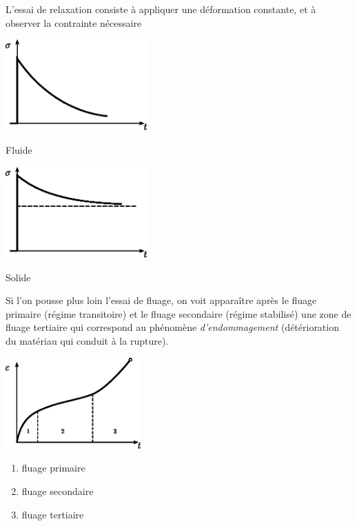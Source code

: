 L'essai de relaxation consiste à appliquer une déformation constante, et à observer la contrainte nécessaire
\begin{multicols}{2}
    \begin{center}
        \includegraphics[height=3.5cm]{../images/T1_Ch04-0019}

        Fluide
    \end{center}
    \columnbreak
    \begin{center}
        \includegraphics[height=3.5cm]{../images/T1_Ch04-0020}

        Solide
    \end{center}
\end{multicols}

Si l'on pousse plus loin l'essai de fluage, on voit apparaître après le fluage primaire (régime transitoire) et le fluage secondaire (régime stabilisé) une zone de fluage tertiaire qui correspond au phénomène \emph{d'endommagement} (détérioration du matériau qui conduit à la rupture).
\begin{multicols}{2}
    \begin{center}
        \includegraphics[height=3.5cm]{../images/T1_Ch04-0021}
    \end{center}
    \columnbreak
    \begin{enumerate}
        \item fluage primaire
        \item fluage secondaire
        \item fluage tertiaire
    \end{enumerate}
\end{multicols}

